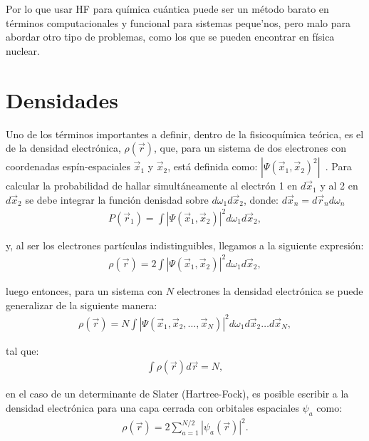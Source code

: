 Por lo que usar HF para química cuántica puede ser un método barato en términos
computacionales y funcional para sistemas peque'nos, pero malo para abordar
otro tipo de problemas, como los que se pueden encontrar en física nuclear.

\section{Densidades}\label{densidades}

Uno de los términos importantes a definir, dentro de la fisicoquímica teórica,
es el de la densidad electrónica, $\rho (\vec{r})$, que, para un sistema de dos
electrones con coordenadas espín-espaciales $\vec{x}_{1}$ y $\vec{x}_2$, está
definida como: $|\Psi (\vec{x}_1 ,  \vec{x}_2)^2|$~\cite{RobertG1994}.  Para
calcular la probabilidad de hallar simultáneamente al electrón 1 en
$d\vec{x}_1$ y al 2 en $d\vec{x}_2$ se debe integrar la función denisdad sobre
$d\omega_1 d\vec{x}_2$, donde: $d\vec{x}_n =  d\vec{r}_n d\omega_n$
\begin{align}
  P(\vec{r}_1)=\int |\Psi (\vec{x}_1 ,  \vec{x}_2)|^2 d\omega_1 d\vec{x}_2 ,
\end{align}

\noindent y, al ser los electrones partículas indistinguibles, llegamos a la
siguiente expresión:
\begin{align}
  \rho(\vec{r})=2\int |\Psi (\vec{x}_1 ,  \vec{x}_2)|^2 d\omega_1 d\vec{x}_2 ,
\end{align}

\noindent luego entonces, para un sistema con $N$ electrones la densidad
electrónica se puede generalizar de la siguiente manera:
\begin{align}
  \rho(\vec{r})=N\int |\Psi (\vec{x}_1 ,  \vec{x}_2,  \ldots , \vec{x}_N)|^2
  d\omega_1 d\vec{x}_2 \ldots d\vec{x}_N ,
\label{definition}
\end{align}

\noindent tal que:
\begin{align}
  \int\rho (\vec{r})d\vec{r} =N ,
\end{align}

\noindent en el caso de un determinante de Slater (Hartree-Fock), es posible
escribir a la densidad electrónica para una capa cerrada con orbitales
espaciales ${\psi_a}$ como:
\begin{align}
  \rho (\vec{r}) = 2 \sum_{a=1}^{N/2} |\psi_a (\vec{r})|^2 .
\end{align}

